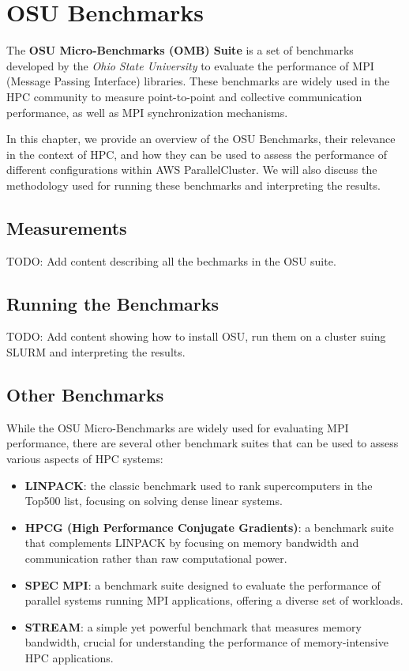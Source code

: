 

\chapter{OSU Benchmarks}

The \textbf{OSU Micro-Benchmarks (OMB) Suite} is a set of benchmarks developed by the \textit{Ohio State University} to evaluate the performance of MPI (Message Passing Interface) libraries. 
These benchmarks are widely used in the HPC community to measure point-to-point and collective communication performance, as well as MPI synchronization mechanisms.

In this chapter, we provide an overview of the OSU Benchmarks, their relevance in the context of HPC, and how they can be used to assess the performance of different configurations within AWS ParallelCluster. 
We will also discuss the methodology used for running these benchmarks and interpreting the results.

\section{Measurements}

TODO: Add content describing all the bechmarks in the OSU suite.

\section{Running the Benchmarks}

TODO: Add content showing how to install OSU, run them on a cluster suing SLURM and interpreting the results.

\section{Other Benchmarks}
While the OSU Micro-Benchmarks are widely used for evaluating MPI performance, there are several other benchmark suites that can be used to assess various aspects of HPC systems:

\begin{itemize}
    \item \textbf{LINPACK}: the classic benchmark used to rank supercomputers in the Top500 list, focusing on solving dense linear systems.
    \item \textbf{HPCG (High Performance Conjugate Gradients)}: a benchmark suite that complements LINPACK by focusing on memory bandwidth and communication rather than raw computational power.
    \item \textbf{SPEC MPI}: a benchmark suite designed to evaluate the performance of parallel systems running MPI applications, offering a diverse set of workloads.
    \item \textbf{STREAM}: a simple yet powerful benchmark that measures memory bandwidth, crucial for understanding the performance of memory-intensive HPC applications.
\end{itemize}